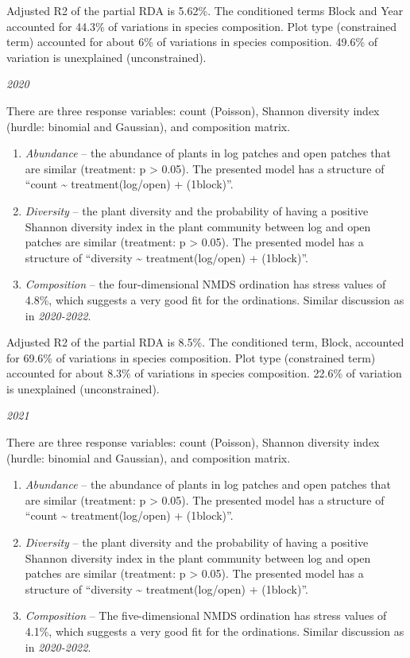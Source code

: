 \documentclass[
]{article}
\providecommand{\tightlist}{%
  \setlength{\itemsep}{0pt}\setlength{\parskip}{0pt}}
\begin{document}
Adjusted R2 of the partial RDA is 5.62\%. The conditioned terms Block
and Year accounted for 44.3\% of variations in species composition. Plot
type (constrained term) accounted for about 6\% of variations in species
composition. 49.6\% of variation is unexplained (unconstrained).

\emph{2020}

There are three response variables: count (Poisson), Shannon diversity
index (hurdle: binomial and Gaussian), and composition matrix.

\begin{enumerate}
\def\labelenumi{\arabic{enumi}.}
\tightlist
\item
  \emph{Abundance} -- the abundance of plants in log patches and open
  patches that are similar (treatment: p \textgreater{} 0.05). The
  presented model has a structure of ``count \textasciitilde{}
  treatment(log/open) + (1\textbar block)''.
\item
  \emph{Diversity} -- the plant diversity and the probability of having
  a positive Shannon diversity index in the plant community between log
  and open patches are similar (treatment: p \textgreater{} 0.05). The
  presented model has a structure of ``diversity \textasciitilde{}
  treatment(log/open) + (1\textbar block)''.
\item
  \emph{Composition} -- the four-dimensional NMDS ordination has stress
  values of 4.8\%, which suggests a very good fit for the ordinations.
  Similar discussion as in \emph{2020-2022}.
\end{enumerate}

Adjusted R2 of the partial RDA is 8.5\%. The conditioned term, Block,
accounted for 69.6\% of variations in species composition. Plot type
(constrained term) accounted for about 8.3\% of variations in species
composition. 22.6\% of variation is unexplained (unconstrained).

\emph{2021}

There are three response variables: count (Poisson), Shannon diversity
index (hurdle: binomial and Gaussian), and composition matrix.

\begin{enumerate}
\def\labelenumi{\arabic{enumi}.}
\tightlist
\item
  \emph{Abundance} -- the abundance of plants in log patches and open
  patches that are similar (treatment: p \textgreater{} 0.05). The
  presented model has a structure of ``count \textasciitilde{}
  treatment(log/open) + (1\textbar block)''.
\item
  \emph{Diversity} -- the plant diversity and the probability of having
  a positive Shannon diversity index in the plant community between log
  and open patches are similar (treatment: p \textgreater{} 0.05). The
  presented model has a structure of ``diversity \textasciitilde{}
  treatment(log/open) + (1\textbar block)''.
\item
  \emph{Composition} -- The five-dimensional NMDS ordination has stress
  values of 4.1\%, which suggests a very good fit for the ordinations.
  Similar discussion as in \emph{2020-2022}.
\end{enumerate}
\end{document}
